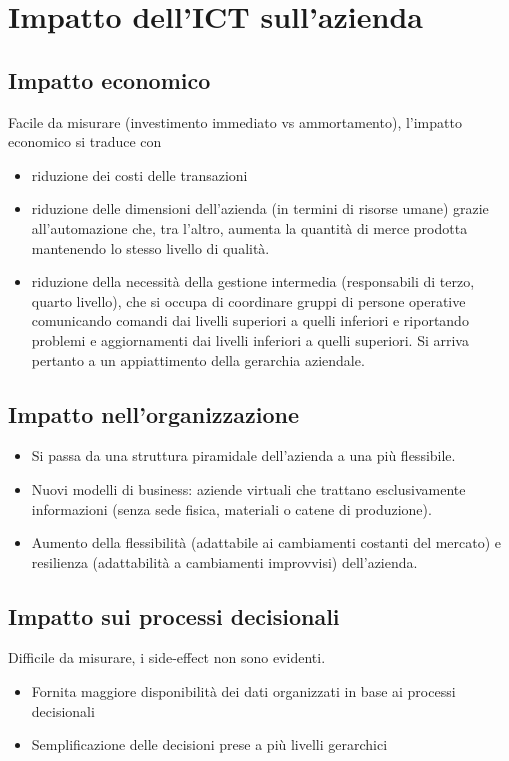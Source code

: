 \section{Impatto dell'ICT sull'azienda}
\subsection{Impatto economico}
Facile da misurare (investimento immediato vs ammortamento), l'impatto economico si traduce con
\begin{itemize}
\item riduzione dei costi delle transazioni
\item riduzione delle dimensioni dell'azienda (in termini di risorse umane) grazie all'automazione che, tra l'altro, aumenta la quantit\`a di merce prodotta mantenendo lo stesso livello di qualit\`a.
\item riduzione della necessit\`a della gestione intermedia (responsabili di terzo, quarto livello), che si occupa di coordinare gruppi di persone operative comunicando comandi dai livelli superiori a quelli inferiori e riportando problemi e aggiornamenti dai livelli inferiori a quelli superiori. Si arriva pertanto a un appiattimento della gerarchia aziendale.
\end{itemize}

\subsection{Impatto nell'organizzazione}
\begin{itemize}
\item Si passa da una struttura piramidale dell'azienda a una pi\`u flessibile.
\item Nuovi modelli di business: aziende virtuali che trattano esclusivamente informazioni (senza sede fisica, materiali o catene di produzione).
\item Aumento della flessibilit\`a (adattabile ai cambiamenti costanti del mercato) e resilienza (adattabilit\`a a cambiamenti improvvisi) dell'azienda.
\end{itemize}

\subsection{Impatto sui processi decisionali}
Difficile da misurare, i side-effect non sono evidenti.
\begin{itemize}
\item Fornita maggiore disponibilit\`a dei dati organizzati in base ai processi decisionali
\item Semplificazione delle decisioni prese a pi\`u livelli gerarchici
\end{itemize}
